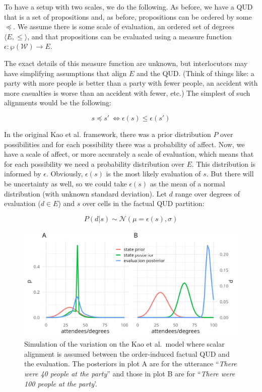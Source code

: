 \documentclass[a4paper,12pt,twoside]{article}
\begin{document}
To have a setup with two scales, we do the following. As before, we have a QUD that is a set of propositions and, as before, propositions can be ordered by some $\preceq$. We assume there is some scale of evaluation, an ordered set of degrees $\langle E,\leq\rangle$, and that propositions can be evaluated using a measure function $\epsilon: \wp(\mathcal{W})\rightarrow E$. 

The exact details of this measure function are unknown, but interlocutors may have simplifying assumptions that align $E$ and the QUD. (Think of things like: a party with more people is better than a party with fewer people, an accident with more casualties is worse than an accident with fewer, etc.) The simplest of such alignments would be the following:

$$s\preceq s'\ \Leftrightarrow \epsilon(s)\leq\epsilon(s')$$

In the original Kao et al. framework, there was a prior distribution $P$ over possibilities and for each possibility there was a probability of affect. Now, we have a scale of affect, or more accurately a scale of evaluation, which means that for each possibility we need a probability distribution over $E$. This distribution is informed by $\epsilon$. Obviously, $\epsilon(s)$ is the most likely evaluation of $s$. But there will be uncertainty as well, so we could take $\epsilon(s)$ as the mean of a normal distribution (with unknown standard deviation). Let $d$ range over degrees of evaluation ($d\in E$) and $s$ over cells in the factual QUD partition:

$$P(d|s) \sim \mathcal{N}(\mu=\epsilon(s),\sigma)$$


\begin{figure}[t]
\includegraphics[width=\textwidth]{kaoalign.png}\caption{Simulation of the variation on the Kao et al.~model where scalar alignment is assumed between the order-induced factual QUD and the evaluation. The posteriors in plot A are for the utterance ``{\em There were 40 people at the party}'' and those in plot B are for ``{\em There were 100 people at the party}'.}\label{kaoa}
\end{figure}
\end{document}
